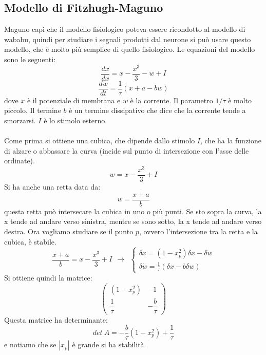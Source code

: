 \documentclass[12pt]{article}
\begin{document}
\subsection{Modello di Fitzhugh-Maguno}
Maguno capì che il modello fisiologico poteva essere ricondotto al modello di wababu, quindi per studiare i segnali prodotti dal neurone si può usare questo modello, che è molto più semplice di quello fisiologico. Le equazioni del modello sono le seguenti:
$$
	\frac{dx}{dx} = x - \frac{x^3}{3} - w + I
$$
$$
	\frac{dw}{dt} = \frac{1}{\tau} (x+a-bw)
$$
dove $x$ è il potenziale di membrana e $w$ è la corrente. Il parametro $1/\tau$ è molto piccolo. Il termine $b$ è un termine dissipativo che dice che la corrente tende a smorzarsi. $I$ è lo stimolo esterno. \\ \\
Come prima si ottiene una cubica, che dipende dallo stimolo $I$, che ha la funzione di alzare o abbassare la curva (incide sul punto di intersezione con l'asse delle ordinate). 
$$
	w = x - \frac{x^3}{3} + I
$$
Si ha anche una retta data da:
$$
	w = \frac{x+a}{b}
$$ 
questa retta può intersecare la cubica in uno o più punti. Se sto sopra la curva, la x tende ad andare verso sinistra, mentre se sono sotto, la x tende ad andare verso destra.
Ora vogliamo studiare se il punto $p$, ovvero l'intersezione tra la retta e la cubica, è stabile. 
$$
	\frac{x+a}{b} = x - \frac{x^3}{3} + I \ \ \longrightarrow \ \ \begin{cases}
	\delta \dot{x} = (1-x_p^2)\delta x - \delta w \\
	\delta \dot{w} = \frac{1}{\tau} (\delta x - b \delta w)
	\end{cases}
$$
Si ottiene quindi la matrice:
$$
	\begin{pmatrix}
		(1-x_p^2) & -1 \\
		\dfrac{1}{\tau} & -\dfrac{b}{\tau}
	\end{pmatrix}
$$
Questa matrice ha determinante:
$$
	det \ A = -\frac{b}{\tau}(1-x_p^2) + \frac{1}{\tau}
$$
e notiamo che se $|x_p|$ è grande si ha stabilità.
\end{document}
